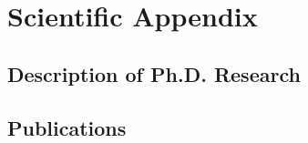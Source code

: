 \documentclass[print]{friggeri-cv} %
\begin{document}

\newpage
\section{Scientific Appendix}
\subsection{Description of Ph.D. Research}
\subsection{Publications}
\end{document}
